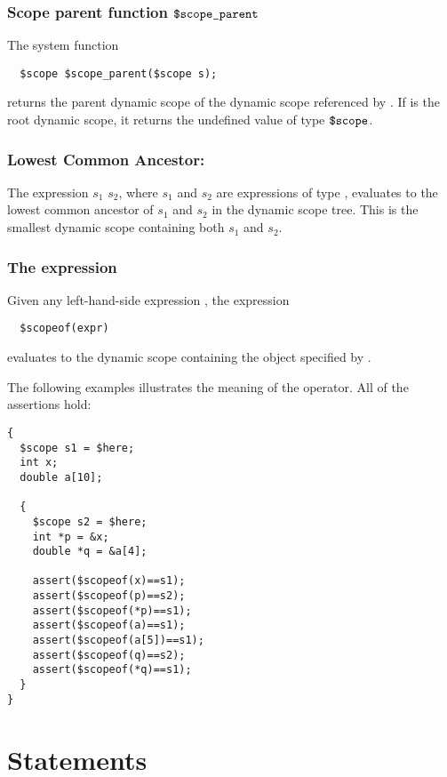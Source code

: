 \subsubsection{Scope parent function $\cscopeparent$}

The system function
\begin{verbatim}
  $scope $scope_parent($scope s);
\end{verbatim}
returns the parent dynamic scope of the dynamic scope referenced by
.  If  is the root dynamic scope, it returns the undefined
value of type $\mbox{\texttt{\${}scope}}$.

\subsubsection{Lowest Common Ancestor: \ct{+}}

The expression $s_1$ \ct{+} $s_2$, where $s_1$ and $s_2$ are
expressions of type \cscope, evaluates to the lowest common ancestor
of $s_1$ and $s_2$ in the dynamic scope tree. This is the smallest
dynamic scope containing both $s_1$ and $s_2$.

\subsubsection{The \cscopeof{} expression}

Given any left-hand-side expression , the expression
\begin{verbatim}
  $scopeof(expr)
\end{verbatim}
evaluates to the dynamic scope containing the object specified by
.

The following examples illustrates the meaning of the \cscopeof{}
operator.  All of the assertions hold:
\begin{verbatim}
{
  $scope s1 = $here;
  int x;
  double a[10];

  {
    $scope s2 = $here;
    int *p = &x;
    double *q = &a[4];

    assert($scopeof(x)==s1);
    assert($scopeof(p)==s2);
    assert($scopeof(*p)==s1);
    assert($scopeof(a)==s1);
    assert($scopeof(a[5])==s1);
    assert($scopeof(q)==s2);
    assert($scopeof(*q)==s1);
  }
}  
\end{verbatim}

\section{Statements}

